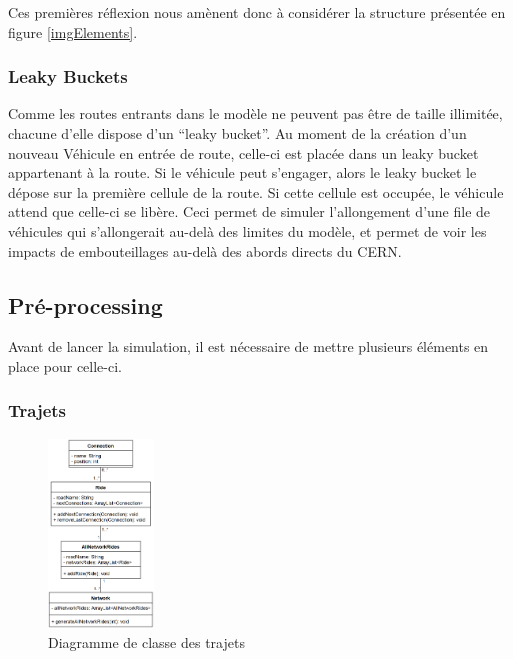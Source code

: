 \documentclass[a4paper,11pt, titlepage]{extarticle}
\begin{document}
Ces premières réflexion nous amènent donc à considérer la structure présentée en figure \ref{imgElements}.

\subsubsection{Leaky Buckets}

Comme les routes entrants dans le modèle ne peuvent pas être de taille illimitée, chacune d'elle dispose d'un ``leaky bucket''. Au moment de la création d'un nouveau Véhicule en entrée de route, celle-ci est placée dans un leaky bucket appartenant à la route. Si le véhicule peut s'engager, alors le leaky bucket le dépose sur la première cellule de la route. Si cette cellule est occupée, le véhicule attend que celle-ci se libère. Ceci permet de simuler l'allongement d'une file de véhicules qui s'allongerait au-delà des limites du modèle, et permet de voir les impacts de embouteillages au-delà des abords directs du CERN.

\subsection{Pré-processing}

Avant de lancer la simulation, il est nécessaire de mettre plusieurs éléments en place pour celle-ci.

\subsubsection{Trajets}

\begin{figure}
  \begin{center}
    \includegraphics[width=0.25\textwidth]{rides_diagram.png}
  \end{center}
  \caption{Diagramme de classe des trajets}
  \label{imgRides}
\end{figure}
\end{document}
